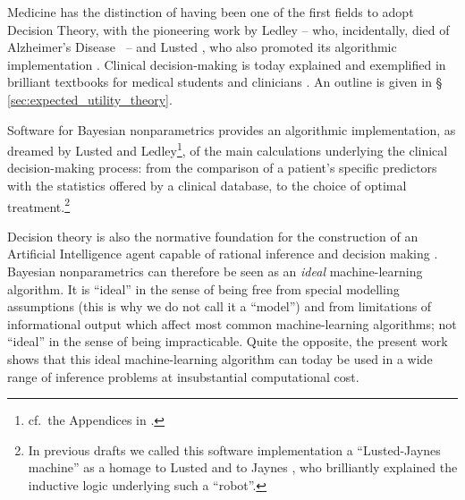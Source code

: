 \documentclass[a4paper,12pt,%
onecolumn,oneside,article,%
british%
]{memoir}
\theoremstyle{remark}
\theoremstyle{innote}
\newcommand*{\citey}{\cites*}
\renewcommand*{\|}[1][]{\nonscript\:#1\vert\nonscript\:\mathopen{}}
\newcommand*{\sect}{\S}%
\newcommand*{\chaps}{chs}%
\newcommand*{\cf}{{cf.}}
\newcommand*{\ad}{Alzheimer's Disease}
\begin{document}
Medicine has the distinction of having been one of the first fields to adopt Decision Theory, with the pioneering work by Ledley -- who, incidentally, died of \ad\ \autocites{shahetal2013} -- and Lusted \autocites{ledleyetal1959,ledleyetal1959b,ledleyetal1960,lustedetal1960,lusted1967}, who also promoted its algorithmic implementation \autocites[\sect\,1-5 p.~21]{lusted1968,ledley1959,ledley1960}. Clinical decision-making is today explained and exemplified in brilliant textbooks for medical students and clinicians \autocites{weinsteinetal1980,soxetal1988_r2013,huninketal2001_r2014}. An outline is given in \sect\,\ref{sec:expected_utility_theory}.

Software for Bayesian nonparametrics provides an algorithmic implementation, as dreamed by Lusted and Ledley\footnote{\cf\ the Appendices in \cites{lusted1968}.}, of the main calculations underlying the clinical decision-making process: from the comparison of a patient's specific predictors with the statistics offered by a clinical database, to the choice of optimal treatment.\footnote{In previous drafts we called this software implementation a \enquote{Lusted-Jaynes machine} as a homage to Lusted  and to Jaynes \citey{jaynes1994_r2003}, who brilliantly explained the inductive logic underlying such a \enquote{robot}.}


Decision theory is also the normative foundation for the construction of an Artificial Intelligence agent capable of rational inference and decision making \autocites[part~IV]{russelletal1995_r2022}[\chaps~1--2, 13--14]{jaynes1994_r2003}. Bayesian nonparametrics can therefore be seen as an \emph{ideal} machine-learning algorithm. It is \enquote{ideal} in the sense of being free from special modelling assumptions (this is why we do not call it a \enquote{model}) and from limitations of informational output which affect most common machine-learning algorithms; not \enquote{ideal} in the sense of being impracticable. Quite the opposite, the present work shows that this ideal machine-learning algorithm can today be used in a wide range of inference problems at insubstantial computational cost. %
\end{document}
